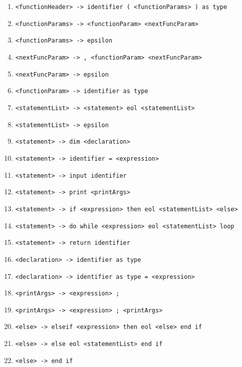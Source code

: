 \documentclass{article}
\begin{document}
\begin{itemize}
\begin{enumerate}
                \item \texttt{<functionHeader> -> identifier ( <functionParams> ) as type}
                
                \item \texttt{<functionParams> -> <functionParam> <nextFuncParam>}
                \item \texttt{<functionParams> -> epsilon}
                
                \item \texttt{<nextFuncParam> -> , <functionParam> <nextFuncParam>}
                \item \texttt{<nextFuncParam> -> epsilon}
                
                \item \texttt{<functionParam> -> identifier as type}
                
                \item \texttt{<statementList> -> <statement> eol <statementList>}
                \item \texttt{<statementList> -> epsilon}
                
                \item \texttt{<statement> -> dim <declaration>}
                \item \texttt{<statement> -> identifier = <expression>}
                \item \texttt{<statement> -> input identifier}
                \item \texttt{<statement> -> print <printArgs>}
                \item \texttt{<statement> -> if <expression> then eol <statementList> <else>}
                \item \texttt{<statement> -> do while <expression> eol <statementList> loop}
                \item \texttt{<statement> -> return identifier}
                
                \item \texttt{<declaration> -> identifier as type}
                \item \texttt{<declaration> -> identifier as type = <expression>}
                
                \item \texttt{<printArgs> -> <expression> ;}
                \item \texttt{<printArgs> -> <expression> ; <printArgs>}
                
                \item \texttt{<else> -> elseif <expression> then eol <else> end if}
                \item \texttt{<else> -> else eol <statementList> end if}
                \item \texttt{<else> -> end if}
                

\end{enumerate}
\end{itemize}
\end{document}
